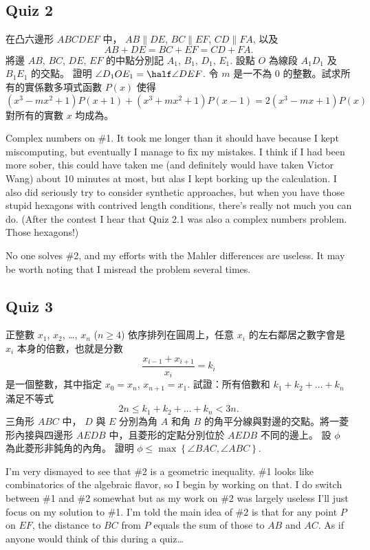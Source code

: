 \documentclass[11pt]{scrreprt}
\begin{document}
\subsection{Quiz 2}
\begin{enumerate}
  \ii 在凸六邊形 $ABCDEF$ 中， $AB \parallel DE$, $BC \parallel EF$, $CD \parallel FA$, 以及
  \[ AB+DE = BC+EF = CD+FA. \]
  將邊 $AB$, $BC$, $DE$, $EF$ 的中點分別記 $A_1$, $B_1$, $D_1$, $E_1$. 設點 $O$ 為線段 $A_1D_1$ 及 $B_1E_1$ 的交點。
  證明 $\angle D_1OE_1 = \half \angle DEF$.
  \ii 令 $m$ 是一不為 $0$ 的整數。試求所有的實係數多項式函數 $P(x)$ 使得
  \[ \left( x^3-mx^2+1 \right) P(x+1) + (x^3+mx^2+1)P(x-1) = 2(x^3-mx+1)P(x) \]
  對所有的實數 $x$ 均成為。 %
\end{enumerate}
Complex numbers on \#1. It took me longer than it should have because I kept miscomputing, but eventually I manage to fix my mistakes. I think if I had been more sober, this could have taken me (and definitely would have taken Victor Wang) about 10 minutes at most, but alas I kept borking up the calculation. I also did seriously try to consider synthetic approaches, but when you have those stupid hexagons with contrived length conditions, there's really not much you can do. (After the contest I hear that Quiz 2.1 was also a complex numbers problem. Those hexagons!)

No one solves \#2, and my efforts with the Mahler differences are useless. It may be worth noting that I misread the problem several times.

\subsection{Quiz 3}
\begin{enumerate}
  \ii 正整數 $x_1$, $x_2$, \dots, $x_n$ ($n \ge 4$) 依序排列在圓周上，任意 $x_i$ 的左右鄰居之數字會是 $x_i$ 本身的倍數，也就是分數
  \[ \frac{x_{i-1}+x_{i+1}}{x_i} = k_i \]
  是一個整數，其中指定 $x_0 = x_n$, $x_{n+1} = x_1$. 試證：所有倍數和 $k_1 + k_2 + \dots + k_n$ 滿足不等式
  \[ 2n \le k_1 + k_2 + \dots + k_n < 3n. \]
  \ii 三角形 $ABC$ 中，  $D$ 與 $E$ 分別為角 $A$ 和角 $B$ 的角平分線與對邊的交點。將一菱形內接與四邊形 $AEDB$ 中，且菱形的定點分別位於 $AEDB$ 不同的邊上。 設 $\phi$ 為此菱形非鈍角的內角。 證明 $\phi \le \max \left\{ \angle BAC, \angle ABC \right\}$. %
\end{enumerate}
I'm very dismayed to see that \#2 is a geometric inequality. \#1 looks like combinatorics of the algebraic flavor, so I begin by working on that. I do switch between \#1 and \#2 somewhat but as my work on \#2 was largely useless I'll just focus on my solution to \#1.
I'm told the main idea of \#2 is that for any point $P$ on $EF$, the distance to $BC$ from $P$ equals the sum of those to $AB$ and $AC$. As if anyone would think of this during a quiz\dots
\end{document}
